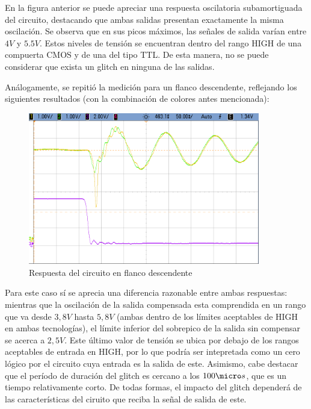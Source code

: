 En la figura anterior se puede apreciar una respuesta oscilatoria subamortiguada del circuito, destacando que ambas salidas presentan exactamente la misma oscilaci\'on. Se observa que en sus picos m\'aximos, las se\~nales de salida var\'ian entre $4V$ y $5.5V$. Estos niveles de tensi\'on se encuentran dentro del rango HIGH de una compuerta CMOS y de una del tipo TTL. De esta manera, no se puede considerar que exista un glitch en ninguna de las salidas.

An\'alogamente, se repiti\'o la medici\'on para un flanco descendente, reflejando los siguientes resultados (con la combinaci\'on de colores antes mencionada):

\begin{figure}[H]
    \centering
    \includegraphics[width=0.9\textwidth]{../EJ3/Recursos/cropped_EJ3_negative_slope_response.png}
	\caption{Respuesta del circuito en flanco descendente}
   	\label{fig:EJ3_negative_slope_response}
\end{figure}

Para este caso s\'i se aprecia una diferencia razonable entre ambas respuestas: mientras que la oscilaci\'on de la salida compensada esta comprendida en un rango que va desde $3,8V$ hasta $5,8V$ (ambas dentro de los l\'imites aceptables de HIGH en ambas tecnolog\'ias), el l\'imite inferior del sobrepico de la salida sin compensar se acerca a $2,5V$. Este \'ultimo valor de tensi\'on se ubica por debajo de los rangos aceptables de entrada en HIGH, por lo que podr\'ia ser intepretada como un cero l\'ogico por el circuito cuya entrada es la salida de este. Asimismo, cabe destacar que el per\'iodo de duraci\'on del glitch es cercano a los $100 \micro s$, que es un tiempo relativamente corto. De todas formas, el impacto del glitch depender\'a de las caracter\'isticas del ciruito que reciba la se\~nal de salida de este. 

